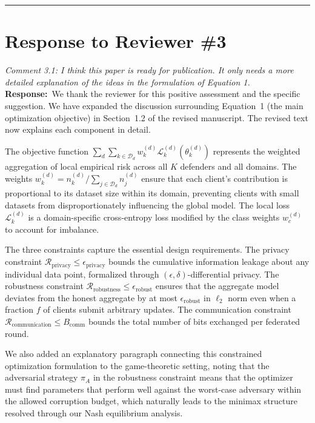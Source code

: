 \documentclass[12pt,a4paper]{article}
\newcommand{\RC}[1]{\noindent\textit{#1}\vspace{0.3em}\\}
\newcommand{\AR}{\noindent\textbf{Response:}~}
\begin{document}
\vspace{1.5em}
\hrule
\vspace{1em}

\section*{Response to Reviewer \#3}

\RC{Comment 3.1: I think this paper is ready for publication. It only needs a more detailed explanation of the ideas in the formulation of Equation 1.}

\AR We thank the reviewer for this positive assessment and the specific suggestion. We have expanded the discussion surrounding Equation~1 (the main optimization objective) in Section~1.2 of the revised manuscript. The revised text now explains each component in detail.

The objective function $\sum_d \sum_{k \in \mathcal{D}_d} w_k^{(d)} \mathcal{L}_k^{(d)}(\theta_k^{(d)})$ represents the weighted aggregation of local empirical risk across all $K$ defenders and all domains. The weights $w_k^{(d)} = n_k^{(d)} / \sum_{j \in \mathcal{D}_d} n_j^{(d)}$ ensure that each client's contribution is proportional to its dataset size within its domain, preventing clients with small datasets from disproportionately influencing the global model. The local loss $\mathcal{L}_k^{(d)}$ is a domain-specific cross-entropy loss modified by the class weights $w_c^{(d)}$ to account for imbalance.

The three constraints capture the essential design requirements. The privacy constraint $\mathcal{R}_{\text{privacy}} \leq \epsilon_{\text{privacy}}$ bounds the cumulative information leakage about any individual data point, formalized through $(\epsilon, \delta)$-differential privacy. The robustness constraint $\mathcal{R}_{\text{robustness}} \leq \epsilon_{\text{robust}}$ ensures that the aggregate model deviates from the honest aggregate by at most $\epsilon_{\text{robust}}$ in $\ell_2$ norm even when a fraction $f$ of clients submit arbitrary updates. The communication constraint $\mathcal{R}_{\text{communication}} \leq B_{\text{comm}}$ bounds the total number of bits exchanged per federated round.

We also added an explanatory paragraph connecting this constrained optimization formulation to the game-theoretic setting, noting that the adversarial strategy $\pi_A$ in the robustness constraint means that the optimizer must find parameters that perform well against the worst-case adversary within the allowed corruption budget, which naturally leads to the minimax structure resolved through our Nash equilibrium analysis.
\end{document}
